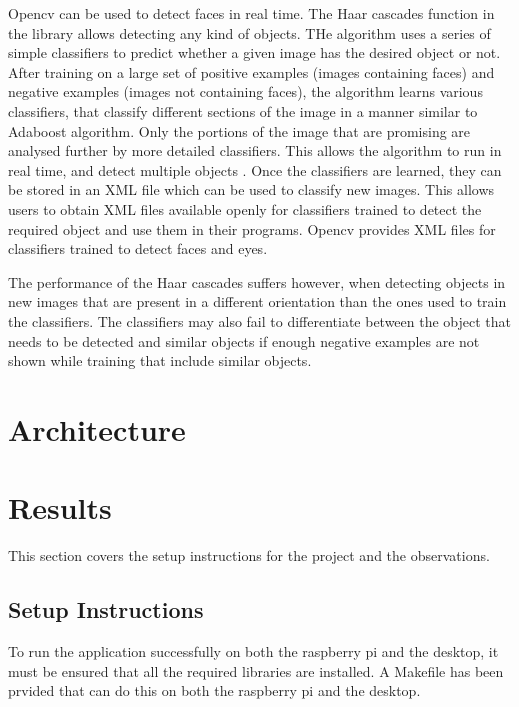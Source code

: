 \documentclass[sigconf]{acmart}
\begin{document}
Opencv can be used to detect faces in real time. The Haar cascades function in the library allows detecting any kind of objects. THe algorithm uses a series of simple classifiers to predict whether a given image has the desired object or not. After training on a large set of positive examples (images containing faces) and negative examples (images not containing faces), the algorithm learns various classifiers, that classify different sections of the image in a manner similar to Adaboost algorithm. Only the portions of the image that are promising are analysed further by more detailed classifiers. This allows the algorithm to run in real time, and detect multiple objects \cite{opencv-haar}\cite{haar-wiki}. Once the classifiers are learned, they can be stored in an XML file which can be used to classify new images. This allows users to obtain XML files available openly for classifiers trained to detect the required object and use them in their programs. Opencv provides XML files for classifiers trained to detect faces and eyes.

The performance of the Haar cascades suffers however, when detecting objects in new images that are present in a different orientation than the ones used to train the classifiers. The classifiers may also fail to differentiate between the object that needs to be detected and similar objects if enough negative examples are not shown while training that include similar objects.

\section{Architecture}

\section{Results}
This section covers the setup instructions for the project and the observations.

\subsection{Setup Instructions}
To run the application successfully on both the raspberry pi and the desktop, it must be ensured that all the required libraries are installed. A Makefile has been prvided that can do this on both the raspberry pi and the desktop.
\end{document}
